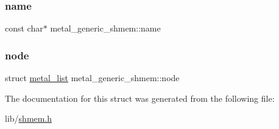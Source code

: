\subsubsection{\texorpdfstring{name}{name}}
{\footnotesize\ttfamily const char$\ast$ metal\+\_\+generic\+\_\+shmem\+::name}

\mbox{\label{structmetal__generic__shmem_ad944a8261f79fa83d29c9d7cfd7b2103}} 
\subsubsection{\texorpdfstring{node}{node}}
{\footnotesize\ttfamily struct \hyperlink{structmetal__list}{metal\+\_\+list} metal\+\_\+generic\+\_\+shmem\+::node}



The documentation for this struct was generated from the following file\+:\begin{DoxyCompactItemize}
\item 
lib/\hyperlink{shmem_8h}{shmem.\+h}\end{DoxyCompactItemize}
